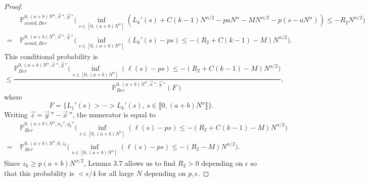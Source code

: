 \documentclass[12pt]{article}
\begin{document}
\begin{proof}
\begin{align*}
		& \mathbb{P}^{0, (a+b)N^\alpha, \vec{x}\,'', \vec{y}\,''}_{avoid, Ber} \Big( \inf_{s\in[0,(a+b)N^\alpha]} (L_k'(s) + C(k-1)N^{\alpha/2} - paN^\alpha - MN^{\alpha/2} - p(s-aN^\alpha)) \leq -R_2N^{\alpha/2} \Big)\\
		= \; & \mathbb{P}^{0, (a+b)N^\alpha, \vec{x}\,'', \vec{y}\,''}_{avoid, Ber} \Big( \inf_{s\in[0,(a+b)N^\alpha]} (L_k'(s) - ps) \leq -(R_2+C(k-1)-M)N^{\alpha/2} \Big).
		\end{align*}
		This conditional probability is 
		\[
		\leq \frac{\mathbb{P}^{0, (a+b)N^\alpha, \vec{x}\,'', \vec{y}\,''}_{Ber} \Big( \inf_{s\in[0,(a+b)N^\alpha]} (\ell(s) - ps) \leq -(R_2+C(k-1)-M)N^{\alpha/2} \Big)}{\mathbb{P}^{0, (a+b)N^\alpha, \vec{x}\,'', \vec{y}\,''}_{Ber}(F)},
		\]
		where
		\[
		F = \{L_1'(s) > \cdots > L_k'(s), \,s\in\llbracket 0, (a+b)N^\alpha\rrbracket\}.
		\]
		Writing $\vec{z} = \vec{y}\,'' - \vec{x}\,''$, the numerator is equal to
		\begin{align*}
		& \mathbb{P}^{0, (a+b)N^\alpha, x_k'', y_k''}_{Ber} \Big( \inf_{s\in[0,(a+b)N^\alpha]} (\ell(s) - ps) \leq -(R_2+C(k-1)-M)N^{\alpha/2} \Big)\\
		= \; & \mathbb{P}^{0, (a+b)N^\alpha, 0, z_k}_{Ber} \Big( \inf_{s\in[0,(a+b)N^\alpha]} (\ell(s) - ps) \leq -(R_2 -M) N^{\alpha/2} \Big).
		\end{align*}
		Since $z_k\geq p(a+b)N^{\alpha/2}$, Lemma 3.7 allows us to find $R_2>0$ depending on $\epsilon$ so that this probability is $<\epsilon/4$ for all large $N$ depending on $p,\epsilon$.
		

\end{proof}
\end{document}
